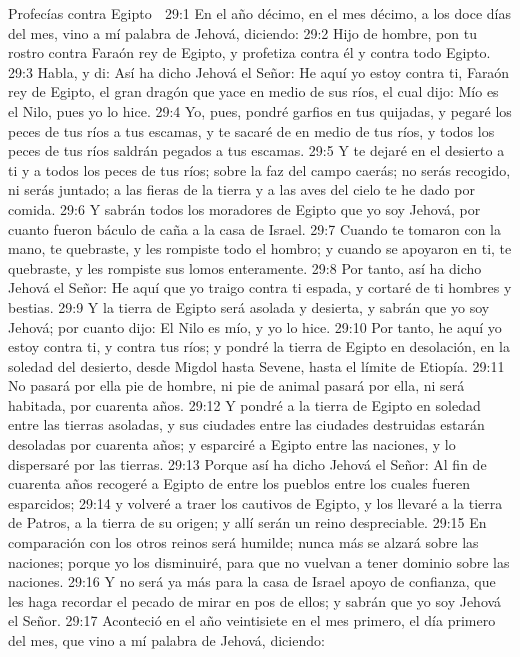 Profecías contra Egipto  

29:1 En el año décimo, en el mes décimo, a los doce días del mes, vino a mí palabra de Jehová, diciendo:  
29:2 Hijo de hombre, pon tu rostro contra Faraón rey de Egipto, y profetiza contra él y contra todo Egipto.  
29:3 Habla, y di: Así ha dicho Jehová el Señor: He aquí yo estoy contra ti, Faraón rey de Egipto, el gran dragón que yace en medio de sus ríos, el cual dijo: Mío es el Nilo, pues yo lo hice.  
29:4 Yo, pues, pondré garfios en tus quijadas, y pegaré los peces de tus ríos a tus escamas, y te sacaré de en medio de tus ríos, y todos los peces de tus ríos saldrán pegados a tus escamas.  
29:5 Y te dejaré en el desierto a ti y a todos los peces de tus ríos; sobre la faz del campo caerás; no serás recogido, ni serás juntado; a las fieras de la tierra y a las aves del cielo te he dado por comida.  
29:6 Y sabrán todos los moradores de Egipto que yo soy Jehová, por cuanto fueron báculo de caña a la casa de Israel.  
29:7 Cuando te tomaron con la mano, te quebraste, y les rompiste todo el hombro; y cuando se apoyaron en ti, te quebraste, y les rompiste sus lomos enteramente.  
29:8 Por tanto, así ha dicho Jehová el Señor: He aquí que yo traigo contra ti espada, y cortaré de ti hombres y bestias.  
29:9 Y la tierra de Egipto será asolada y desierta, y sabrán que yo soy Jehová; por cuanto dijo: El Nilo es mío, y yo lo hice. 
29:10 Por tanto, he aquí yo estoy contra ti, y contra tus ríos; y pondré la tierra de Egipto en desolación, en la soledad del desierto, desde Migdol hasta Sevene, hasta el límite de Etiopía.  
29:11 No pasará por ella pie de hombre, ni pie de animal pasará por ella, ni será habitada, por cuarenta años.  
29:12 Y pondré a la tierra de Egipto en soledad entre las tierras asoladas, y sus ciudades entre las ciudades destruidas estarán desoladas por cuarenta años; y esparciré a Egipto entre las naciones, y lo dispersaré por las tierras.  
29:13 Porque así ha dicho Jehová el Señor: Al fin de cuarenta años recogeré a Egipto de entre los pueblos entre los cuales fueren esparcidos;  
29:14 y volveré a traer los cautivos de Egipto, y los llevaré a la tierra de Patros, a la tierra de su origen; y allí serán un reino despreciable.  
29:15 En comparación con los otros reinos será humilde; nunca más se alzará sobre las naciones; porque yo los disminuiré, para que no vuelvan a tener dominio sobre las naciones.  
29:16 Y no será ya más para la casa de Israel apoyo de confianza, que les haga recordar el pecado de mirar en pos de ellos; y sabrán que yo soy Jehová el Señor.  
29:17 Aconteció en el año veintisiete en el mes primero, el día primero del mes, que vino a mí palabra de Jehová, diciendo:  
